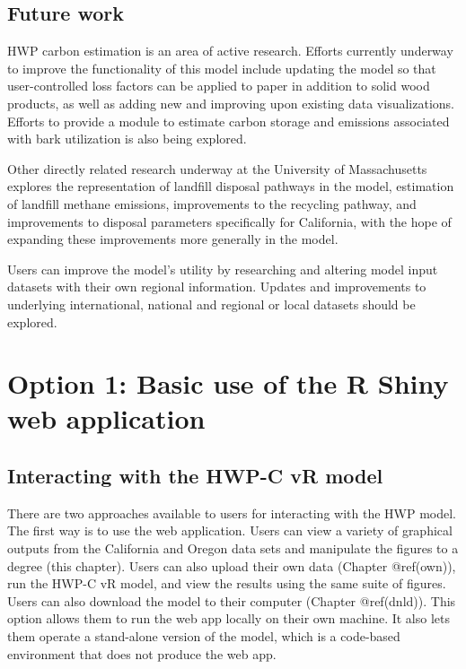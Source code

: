 \documentclass[
  openany]{book}
\begin{document}
\hypertarget{int-future}{%
\section{Future work}\label{int-future}}

HWP carbon estimation is an area of active research. Efforts currently
underway to improve the functionality of this model include updating the
model so that user-controlled loss factors can be applied to paper in
addition to solid wood products, as well as adding new and improving
upon existing data visualizations. Efforts to provide a module to
estimate carbon storage and emissions associated with bark utilization
is also being explored.

Other directly related research underway at the University of
Massachusetts explores the representation of landfill disposal pathways
in the model, estimation of landfill methane emissions, improvements to
the recycling pathway, and improvements to disposal parameters
specifically for California, with the hope of expanding these
improvements more generally in the model.

Users can improve the model's utility by researching and altering model
input datasets with their own regional information. Updates and
improvements to underlying international, national and regional or local
datasets should be explored.

\hypertarget{app}{%
\chapter{Option 1: Basic use of the R Shiny web application}\label{app}}

\hypertarget{app-sum}{%
\section{Interacting with the HWP-C vR model}\label{app-sum}}

There are two approaches available to users for interacting with the HWP
model. The first way is to use the web application. Users can view a
variety of graphical outputs from the California and Oregon data sets
and manipulate the figures to a degree (this chapter). Users can also
upload their own data (Chapter @ref(own)), run the HWP-C vR model, and
view the results using the same suite of figures. Users can also
download the model to their computer (Chapter @ref(dnld)). This option
allows them to run the web app locally on their own machine. It also
lets them operate a stand-alone version of the model, which is a
code-based environment that does not produce the web app.
\end{document}
